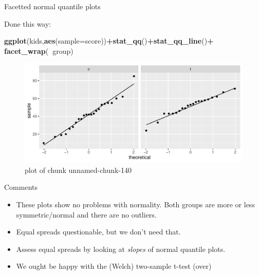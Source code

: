 \documentclass[ignorenonframetext,]{beamer}
\newenvironment{Shaded}{\begin{snugshade}}{\end{snugshade}}
\newcommand{\DataTypeTok}[1]{\textcolor[rgb]{0.13,0.29,0.53}{#1}}
\newcommand{\KeywordTok}[1]{\textcolor[rgb]{0.13,0.29,0.53}{\textbf{#1}}}
\newcommand{\NormalTok}[1]{#1}
\newcommand{\OperatorTok}[1]{\textcolor[rgb]{0.81,0.36,0.00}{\textbf{#1}}}
\providecommand{\tightlist}{%
  \setlength{\itemsep}{0pt}\setlength{\parskip}{0pt}}
\begin{document}
\begin{frame}[fragile]{Facetted normal quantile plots}
\protect\hypertarget{facetted-normal-quantile-plots}{}

Done this way:

\begin{Shaded}
\begin{Highlighting}[]
\KeywordTok{ggplot}\NormalTok{(kids,}\KeywordTok{aes}\NormalTok{(}\DataTypeTok{sample=}\NormalTok{score))}\OperatorTok{+}\KeywordTok{stat_qq}\NormalTok{()}\OperatorTok{+}\KeywordTok{stat_qq_line}\NormalTok{()}\OperatorTok{+}
\KeywordTok{facet_wrap}\NormalTok{(}\OperatorTok{~}\NormalTok{group)}
\end{Highlighting}
\end{Shaded}

\begin{figure}
\centering
\includegraphics{figure/unnamed-chunk-140-1.pdf}
\caption{plot of chunk unnamed-chunk-140}
\end{figure}

\end{frame}

\begin{frame}{Comments}
\protect\hypertarget{comments-8}{}

\begin{itemize}
\tightlist
\item
  These plots show no problems with normality. Both groups are more or
  less symmetric/normal and there are no outliers.
\item
  Equal spreads questionable, but we don't need that.
\item
  Assess equal spreads by looking at \emph{slopes} of normal quantile
  plots.
\item
  We ought be happy with the (Welch) two-sample t-test (over)
\end{itemize}

\end{frame}
\end{document}
